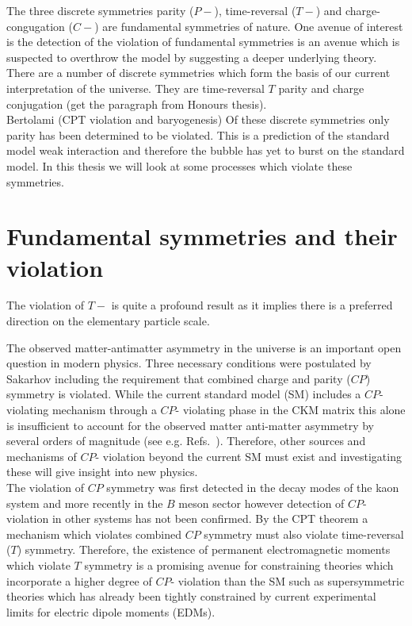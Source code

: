 \documentclass[8pt,a4paper, twoside]{report}
\begin{document}
\fi
The three discrete symmetries parity ($P-$), time-reversal ($T-$) and charge-congugation ($C-$) are fundamental symmetries of nature. 
One avenue of interest is the detection of the violation of fundamental symmetries is an avenue which is suspected to overthrow the model by suggesting a deeper underlying theory.  There are a number of discrete symmetries which form the basis of our current interpretation of the universe. They are time-reversal $T$ parity and charge conjugation (get the paragraph from Honours thesis). \\
Bertolami (CPT violation and baryogenesis)
Of these discrete symmetries only parity has been determined to be violated. This is a prediction of the standard model weak interaction and therefore the bubble has yet to burst on the standard model. In this thesis we will look at some processes which violate these symmetries. 
\chapter{Fundamental symmetries and their violation} 

The violation of $T-$ is quite a profound result as it implies there is a preferred direction on the elementary particle scale.

 The observed matter-antimatter asymmetry in the universe is an important open question in modern physics. Three necessary conditions were postulated by Sakarhov\cite{Sakharov1967} including the requirement that combined charge and parity ($CP$) symmetry  is violated. While the current standard model (SM)  includes a $CP$- violating mechanism through a $CP$- violating phase in the CKM matrix \cite{KM1973} this alone is insufficient to account for the observed matter anti-matter asymmetry by several orders of magnitude (see e.g. Refs.~\cite{Sakharov1967,Farrar1993, Huet1994, Pospelov2005, Canetti2012, FS2010}). Therefore, other sources and mechanisms of $CP$- violation beyond the current SM must exist and investigating these will give insight into new physics. \\ 
\linebreak
The violation of $CP$ symmetry was first detected in the decay modes of the kaon system \cite{Christenson1964} and more recently in the $B$ meson sector \cite{Belle2001, Aaij2013} however detection of $CP$- violation in other systems has not been confirmed. By the CPT theorem a mechanism which violates combined $CP$ symmetry must also violate time-reversal ($T$) symmetry. Therefore, the existence of  permanent electromagnetic moments which violate $T$ symmetry is a promising avenue for constraining theories which  incorporate a  higher degree of $CP$- violation than the SM such as supersymmetric theories which has already been tightly constrained by current experimental limits for electric dipole moments (EDMs)\cite{Pospelov2005, Safronova2017, Chupp2018}. 
\end{document}

